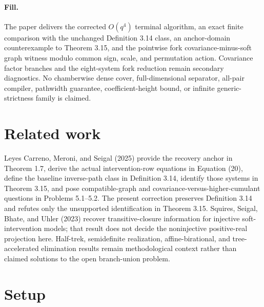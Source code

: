 \documentclass{article}
\begin{document}
\paragraph{Fill.} The paper delivers the corrected \(O(q^4)\) terminal algorithm, an exact finite comparison with the unchanged Definition 3.14 class, an anchor-domain counterexample to Theorem 3.15, and the pointwise fork covariance-minus-soft graph witness modulo common sign, scale, and permutation action. Covariance factor branches and the eight-system fork reduction remain secondary diagnostics. No chamberwise dense cover, full-dimensional separator, all-pair compiler, pathwidth guarantee, coefficient-height bound, or infinite generic-strictness family is claimed.

\section{Related work}

Leyes Carreno, Meroni, and Seigal (2025) provide the recovery anchor in Theorem 1.7, derive the actual intervention-row equations in Equation (20), define the baseline inverse-path class in Definition 3.14, identify those systems in Theorem 3.15, and pose compatible-graph and covariance-versus-higher-cumulant questions in Problems 5.1--5.2. The present correction preserves Definition 3.14 and refutes only the unsupported identification in Theorem 3.15. Squires, Seigal, Bhate, and Uhler (2023) recover transitive-closure information for injective soft-intervention models; that result does not decide the noninjective positive-real projection here. Half-trek, semidefinite realization, affine-birational, and tree-accelerated elimination results remain methodological context rather than claimed solutions to the open branch-union problem.

\section{Setup}
\end{document}
